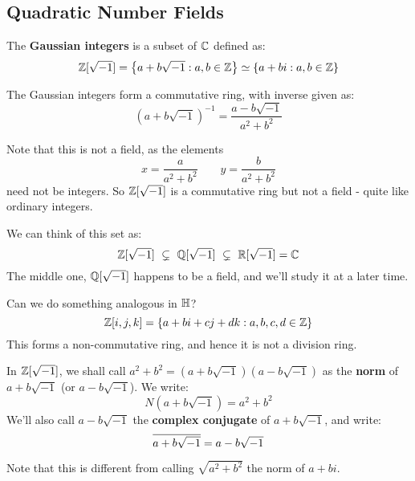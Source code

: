 \newpage
\subsection{Quadratic Number Fields}

\begin{defn}
    The \textbf{Gaussian integers} is a subset of $ \mathbb{C} $ defined as:
    \begin{equation*}
        \mathbb{Z}[\sqrt{-1}] = \left\{{a + b\sqrt{-1} : a, b \in \mathbb{Z}}\right\} \simeq
        \left\{{a + bi : a, b \in \mathbb{Z}}\right\}
    \end{equation*}
\end{defn}

The Gaussian integers form a commutative ring, with inverse given as:
\begin{equation*}
    (a + b\sqrt{-1})^{-1} = \frac{a-b\sqrt{-1}}{a^{2}+b^{2}}
\end{equation*}

Note that this is not a field, as the elements
\begin{equation*}
    x = \frac{a}{a^{2}+b^{2}} \qquad y = \frac{b}{a^{2} + b^{2}}
\end{equation*}
need not be integers.
So $ \mathbb{Z}[\sqrt{-1}] $ is a commutative ring but not a field - quite like ordinary integers.

We can think of this set as:
\begin{equation*}
    \bb{Z}[\sqrt{-1}] \ \subsetneq \ \bb{Q}[\sqrt{-1}] \ \subsetneq \ \bb{R}[\sqrt{-1}] = \bb{C}
\end{equation*}
The middle one, $ \mathbb{Q}[\sqrt{-1}] $ happens to be a field, and we'll study it at a later time.

Can we do something analogous in $ \mathbb{H} $?
\begin{equation*}
    \mathbb{Z}[i,j,k] = \left\{{a+bi+cj+dk : a,b,c,d \in \mathbb{Z}}\right\}
\end{equation*}
This forms a non-commutative ring, and hence it is not a division ring.

\begin{defn}
    In $ \mathbb{Z}[\sqrt{-1}] $, we shall call $ a^{2}+b^{2} = (a+b\sqrt{-1})(a-b\sqrt{-1}) $ as
    the \textbf{norm} of $ a+b\sqrt{-1} $ (or $ a - b\sqrt{-1} $). We write:
    \begin{equation*}
        N(a+b\sqrt{-1}) = a^{2}+b^{2}
    \end{equation*}
    We'll also call $ a-b\sqrt{-1} $ the \textbf{complex conjugate} of $ a+b\sqrt{-1} $,
    and write:
    \begin{equation*}
        \overline{a+b\sqrt{-1}} = a-b\sqrt{-1}
    \end{equation*}
\end{defn}
Note that this is different from calling $ \sqrt{a^{2} + b^{2}} $ the norm of $ a+bi $.

